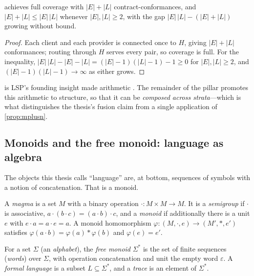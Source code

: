 \begin{proposition}
\label{prop:mplusn}
 achieves full coverage with $|E|+|L|$ contract-conformances, and
$|E|+|L| \le |E|\,|L|$ whenever $|E|,|L|\ge 2$, with the gap
$|E|\,|L|-(|E|+|L|)$ growing without bound.
\end{proposition}
\begin{proof}
Each client and each provider is connected once to $H$, giving $|E|+|L|$
conformances; routing through $H$ serves every pair, so coverage is full. For the
inequality, $|E|\,|L|-|E|-|L|=(|E|-1)(|L|-1)-1\ge 0$ for $|E|,|L|\ge 2$, and
$(|E|-1)(|L|-1)\to\infty$ as either grows.
\end{proof}

 is LSP's founding insight made arithmetic
\citep{lsp-official,lsp-mxn-fcc}. The remainder of the pillar promotes this
arithmetic to structure, so that it can be \emph{composed across strata}---which
is what distinguishes the thesis's fusion claim from a single application of
\cref{prop:mplusn}.

\subsection{Monoids and the free monoid: language as algebra}
\label{sec:alg-monoid}

The objects this thesis calls ``language'' are, at bottom, sequences of symbols
with a notion of concatenation. That is a monoid.

\begin{definition}
A \emph{magma} is a set $M$ with a binary operation $\cdot\colon M\times M\to M$.
It is a \emph{semigroup} if $\cdot$ is associative, $a\cdot(b\cdot c)=(a\cdot
b)\cdot c$, and a \emph{monoid} if additionally there is a unit $e$ with $e\cdot
a=a\cdot e=a$. A monoid homomorphism $\varphi\colon (M,\cdot,e)\to(M',\ast,e')$
satisfies $\varphi(a\cdot b)=\varphi(a)\ast\varphi(b)$ and $\varphi(e)=e'$.
\end{definition}

\begin{definition}
For a set $\Sigma$ (an \emph{alphabet}), the \emph{free monoid} $\Sigma^{*}$ is
the set of finite sequences (\emph{words}) over $\Sigma$, with operation
concatenation and unit the empty word $\varepsilon$. A \emph{formal language} is
a subset $L\subseteq\Sigma^{*}$, and a \emph{trace} is an element of
$\Sigma^{*}$.
\end{definition}

